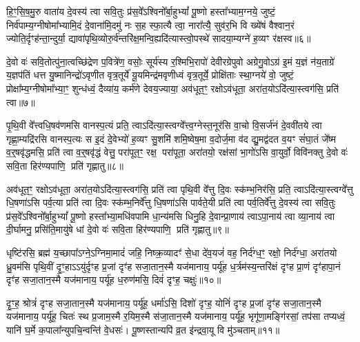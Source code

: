 हि॒ꣳ॒सि॒ष॒मु॒रु वाता॑य दे॒वस्य॑ त्वा सवि॒तुः प्र॑स॒वे᳚\-ऽश्विनो᳚र्बा॒हु\-भ्यां᳚ पू॒ष्णो हस्ता᳚भ्याम॒ग्नये॒ जुष्टं॒ निर्व॑पाम्य॒ग्नी\-षोमा᳚भ्यामि॒दं दे॒वाना॑मि॒दमु॑ नः स॒ह स्फा॒त्यै त्वा॒ नारा᳚त्यै॒ सुव॑र॒भि वि ख्ये॑षं वैश्वान॒रं ज्योति॒र्दृꣳह॑न्ता॒न्दुर्या॒ द्यावा॑पृथि॒व्योरु॒र्व॑न्तरि॑क्ष॒मन्वि॒ह्यदि॑त्यास्त्वो॒पस्थे॑ सादया॒म्यग्ने॑ ह॒व्यꣳ र॑क्षस्व॥६॥

{\anuvakamend[{मा त्वा॒ षट्च॑त्वारिꣳशच्च। (4)}]}

दे॒वो वः॑ सवि॒तोत्पु॑ना॒त्वच्छि॑द्रेण प॒वित्रे॑ण॒ वसोः॒ सूर्य॑स्य र॒श्मिभि॒रापो॑ देवीरग्रेपुवो अग्रेगु॒वो\-ऽग्र॑ इ॒मं य॒ज्ञं न॑य॒ताग्रे॑ य॒ज्ञप॑तिं धत्त यु॒ष्मानिन्द्रो॑\-ऽवृणीत वृत्र॒तूर्ये॑ यू॒यमिन्द्र॑मवृणीध्वं वृत्र॒तूर्ये॒ प्रोक्षि॑ताः स्था॒ग्नये॑ वो॒ जुष्टं॒ प्रोक्षा᳚म्य॒ग्नीषोमा᳚भ्या॒ꣳ॒ शुन्ध॑ध्वं॒ दैव्या॑य॒ कर्म॑णे देवय॒ज्याया॒ अव॑धूत॒ꣳ॒ रक्षो\-ऽव॑धूता॒ अरा॑त॒यो\-ऽदि॑त्या॒स्त्वग॑सि॒ प्रति॑ त्वा॥७॥

पृ॒थि॒वी वे᳚त्त्वधि॒षव॑णमसि वानस्प॒त्यं प्रति॒ त्वा\-ऽदि॑त्या॒स्त्वग्वे᳚त्त्व॒ग्नेस्त॒नूर॑सि वा॒चो वि॒सर्ज॑नं दे॒ववी॑तये त्वा गृह्णा॒म्यद्रि॑रसि वानस्प॒त्यः स इ॒दं दे॒वेभ्यो॑ ह॒व्यꣳ सु॒शमि॑ शमि॒ष्वेष॒मा व॒दोर्ज॒मा व॑द द्यु॒मद्व॑दत व॒यꣳ सं॑घा॒तं जे᳚ष्म व॒र्॒षवृ॑द्धमसि॒ प्रति॑ त्वा व॒र्॒षवृ॑द्धं वेत्तु॒ परा॑पूत॒ꣳ॒ रक्ष॒ परा॑पूता॒ अरा॑तयो॒ रक्ष॑सां भा॒गो॑\-ऽसि वा॒युर्वो॒ विवि॑नक्तु दे॒वो वः॑ सवि॒ता हिर॑ण्यपाणि॒ प्रति॑ गृह्णातु॥८॥

{\anuvakamend[{त्वा॒ भा॒ग एका॑दश च। (5)}]}

अव॑धूत॒ꣳ॒ रक्षो\-ऽव॑धूता॒ अरा॑त॒यो\-ऽदि॑त्या॒स्त्वग॑सि॒ प्रति॑ त्वा पृथि॒वी वे᳚त्तु दि॒वः स्क॑म्भ॒निर॑सि॒ प्रति॒ त्वा\-ऽदि॑त्या॒स्त्वग्वे᳚त्तु धि॒षणा॑\-ऽसि पर्व॒त्या प्रति॑ त्वा दि॒वः स्क॑म्भ॒निर्वे᳚त्तु धि॒षणा॑\-ऽसि पार्वते॒यी प्रति॑ त्वा पर्व॒तिर्वे᳚त्तु दे॒वस्य॑ त्वा सवि॒तुः प्र॑स॒वे᳚\-ऽश्विनो᳚र्बा॒हु\-भ्यां᳚ पू॒ष्णो हस्ता᳚भ्या॒मधि॑वपामि धा॒न्य॑मसि धिनु॒हि दे॒वान्प्रा॒णाय॑ त्वा\-ऽपा॒नाय॑ त्वा व्या॒नाय॑ त्वा दी॒र्घामनु॒ प्रसि॑ति॒मायु॑षे धां दे॒वो वः॑ सवि॒ता हिर॑ण्यपाणि॒ प्रति॑ गृह्णातु॥९॥

{\anuvakamend[{प्रा॒णाय॑ त्वा॒ पञ्च॑दश च। (6)}]}

धृष्टि॑रसि॒ ब्रह्म॑ य॒च्छापा᳚\-ऽग्ने॒\-ऽग्निमा॒मादं॑ जहि॒ निष्क्र॒व्यादꣳ॑ से॒धा दे॑व॒यजं॑ वह॒ निर्द॑ग्ध॒ꣳ॒ रक्षो॒ निर्द॑ग्धा॒ अरा॑तयो ध्रु॒वम॑सि पृथि॒वीं दृ॒ꣳ॒हाऽऽयु॑र्दृꣳह प्र॒जां दृꣳ॑ह सजा॒तान॒स्मै यज॑मानाय॒ पर्यू॑ह ध॒र्त्रम॑स्य॒न्तरि॑क्षं दृꣳह प्रा॒णं दृꣳ॑हापा॒नं दृꣳ॑ह सजा॒ता\-न॒स्मै यज॑मानाय॒ पर्यू॑ह ध॒रुण॑मसि॒ दिवं॑ दृꣳह॒ चक्षुः॑॥१०॥

दृ॒ꣳ॒ह॒ श्रोत्रं॑ दृꣳह सजा॒तान॒स्मै यज॑मानाय॒ पर्यू॑ह॒ धर्मा॑\-ऽसि॒ दिशो॑ दृꣳह॒ योनिं॑ दृꣳह प्र॒जां दृꣳ॑ह सजा॒तान॒स्मै यज॑मानाय॒ पर्यू॑ह॒ चितः॑ स्थ प्र॒जाम॒स्मै र॒यिम॒स्मै स॑जा॒तान॒स्मै यज॑मानाय॒ पर्यू॑ह॒ भृगू॑णा॒मङ्गि॑रसां॒ तप॑सा तप्यध्वं॒ यानि॑ घ॒र्मे क॒पाला᳚न्युपचि॒न्वन्ति॑ वे॒धसः॑। पू॒ष्णस्तान्यपि॑ व्र॒त इ॑न्द्रवा॒यू वि मु॑ञ्चताम्॥११॥

